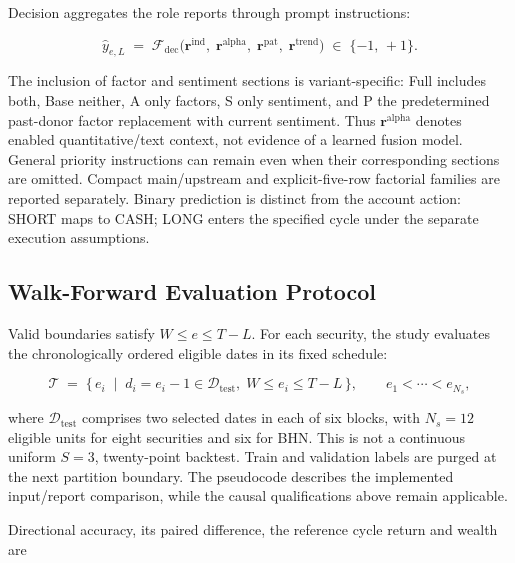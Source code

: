 Decision aggregates the role reports through prompt instructions:

\begin{equation}
    \hat{y}_{e,L} \;=\; \mathcal{F}_{\mathrm{dec}}\!\bigl(
        \mathbf{r}^{\mathrm{ind}},\;
        \mathbf{r}^{\mathrm{alpha}},\;
        \mathbf{r}^{\mathrm{pat}},\;
        \mathbf{r}^{\mathrm{trend}}
    \bigr) \;\in\; \{-1,\, +1\}.
    \label{eq:decision}
\end{equation}


The inclusion of factor and sentiment sections is variant-specific: Full includes both, Base neither, A only factors, S only sentiment, and P the predetermined past-donor factor replacement with current sentiment. Thus $\mathbf{r}^{\mathrm{alpha}}$ denotes enabled quantitative/text context, not evidence of a learned fusion model. General priority instructions can remain even when their corresponding sections are omitted. Compact main/upstream and explicit-five-row factorial families are reported separately. Binary prediction is distinct from the account action: SHORT maps to CASH; LONG enters the specified cycle under the separate execution assumptions.

\subsection{Walk-Forward Evaluation Protocol}
Valid boundaries satisfy $W\le e\le T-L$. For each security, the study evaluates the chronologically ordered eligible dates in its fixed schedule:

\begin{equation}
    \mathcal{T} \;=\;
    \bigl\{\, e_i \;\mid\; d_i=e_i-1\in\mathcal{D}_{\mathrm{test}},\;
    W\le e_i\le T-L\,\bigr\},
    \qquad e_1<\cdots<e_{N_s},
    \label{eq:testpoints}
\end{equation}


where $\mathcal{D}_{\mathrm{test}}$ comprises two selected dates in each of six blocks, with $N_s=12$ eligible units for eight securities and six for BHN. This is not a continuous uniform $S=3$, twenty-point backtest. Train and validation labels are purged at the next partition boundary. The pseudocode describes the implemented input/report comparison, while the causal qualifications above remain applicable.

Directional accuracy, its paired difference, the reference cycle return and wealth are

